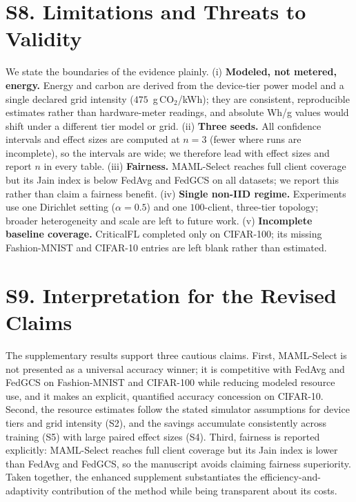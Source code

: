 \documentclass[10pt]{article}
\begin{document}
\section*{S8. Limitations and Threats to Validity}

We state the boundaries of the evidence plainly. (i) \textbf{Modeled, not metered, energy.} Energy and carbon are derived from the device-tier power model and a single declared grid intensity ($475$~g\,CO$_2$/kWh); they are consistent, reproducible estimates rather than hardware-meter readings, and absolute Wh/g values would shift under a different tier model or grid. (ii) \textbf{Three seeds.} All confidence intervals and effect sizes are computed at $n=3$ (fewer where runs are incomplete), so the intervals are wide; we therefore lead with effect sizes and report $n$ in every table. (iii) \textbf{Fairness.} MAML-Select reaches full client coverage but its Jain index is below FedAvg and FedGCS on all datasets; we report this rather than claim a fairness benefit. (iv) \textbf{Single non-IID regime.} Experiments use one Dirichlet setting ($\alpha=0.5$) and one $100$-client, three-tier topology; broader heterogeneity and scale are left to future work. (v) \textbf{Incomplete baseline coverage.} CriticalFL completed only on CIFAR-100; its missing Fashion-MNIST and CIFAR-10 entries are left blank rather than estimated.

\section*{S9. Interpretation for the Revised Claims}

The supplementary results support three cautious claims. First, MAML-Select is not presented as a universal accuracy winner; it is competitive with FedAvg and FedGCS on Fashion-MNIST and CIFAR-100 while reducing modeled resource use, and it makes an explicit, quantified accuracy concession on CIFAR-10. Second, the resource estimates follow the stated simulator assumptions for device tiers and grid intensity (S2), and the savings accumulate consistently across training (S5) with large paired effect sizes (S4). Third, fairness is reported explicitly: MAML-Select reaches full client coverage but its Jain index is lower than FedAvg and FedGCS, so the manuscript avoids claiming fairness superiority. Taken together, the enhanced supplement substantiates the efficiency-and-adaptivity contribution of the method while being transparent about its costs.
\end{document}
